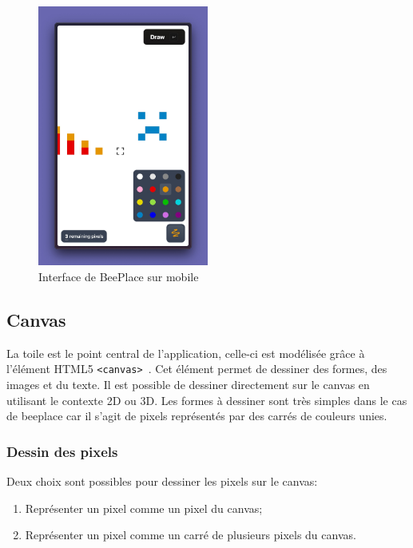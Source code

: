 \begin{figure}[H]
  \centering
  \includegraphics[width=0.5\textwidth]{./assets/figures/screenshot-app-3.jpeg}
  \caption{Interface de BeePlace sur mobile}
  \label{fig:screenshot-app-3}
\end{figure}

\subsection{Canvas}

La toile est le point central de l'application, celle-ci est modélisée grâce à l'élément HTML5 \texttt{<canvas>}~\cite{canvas}. Cet élément permet de dessiner des formes, des images et du texte. Il est possible de dessiner directement sur le canvas en utilisant le contexte 2D ou 3D. Les formes à dessiner sont très simples dans le cas de \gls{beeplace} car il s'agit de pixels représentés par des carrés de couleurs unies.

\subsubsection{Dessin des pixels}

Deux choix sont possibles pour dessiner les pixels sur le canvas:

\begin{enumerate}
  \item Représenter un pixel comme un pixel du canvas;
  \item Représenter un pixel comme un carré de plusieurs pixels du canvas.
\end{enumerate}

